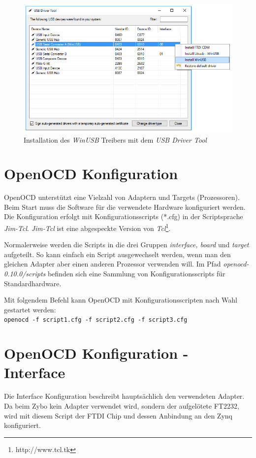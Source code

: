 \begin{figure}[htbp]
	\centering
		\includegraphics[width=12cm,keepaspectratio]{images/InstallWinUSBDriver.png}
	\caption{Installation des \textit{WinUSB} Treibers mit dem \textit{USB Driver Tool}}
	\label{fig:InstallWinUSBDriver}
\end{figure}


\section{OpenOCD Konfiguration}
OpenOCD unterstützt eine Vielzahl von Adaptern und Targets (Prozessoren).
Beim Start muss die Software für die verwendete Hardware konfiguriert werden.
Die Konfiguration erfolgt mit Konfigurationsscripts (*.cfg) in der Scriptsprache \textit{Jim-Tcl}.
\textit{Jim-Tcl} ist eine abgespeckte Version von \textit{Tcl}\footnote{http://www.tcl.tk}.

Normalerweise werden die Scripts in die drei Gruppen \textit{interface, board} und \textit{target} aufgeteilt.
So kann einfach ein Script ausgewechselt werden, wenn man den gleichen Adapter aber einen anderen Prozessor verwenden will.
Im Pfad \textit{openocd-0.10.0/scripts} befinden sich eine Sammlung von Konfigurationsscripts für Standardhardware.

Mit folgendem Befehl kann OpenOCD mit Konfigurationsscripten nach Wahl gestartet werden:\\
\texttt{openocd -f script1.cfg -f script2.cfg -f script3.cfg}


\section{OpenOCD Konfiguration - Interface}
Die Interface Konfiguration beschreibt hauptsächlich den verwendeten Adapter.
Da beim Zybo kein Adapter verwendet wird, sondern der aufgelötete FT2232, wird mit diesem Script der FTDI Chip und dessen Anbindung an den Zynq konfiguriert.

